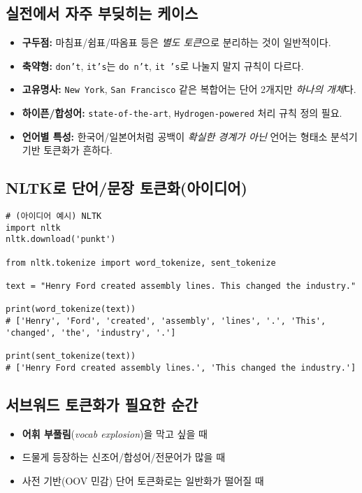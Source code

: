 \documentclass[12pt]{article}
\begin{document}
\subsection{실전에서 자주 부딪히는 케이스}
\begin{itemize}
  \item \textbf{구두점:} 마침표/쉼표/따옴표 등은 \emph{별도 토큰}으로 분리하는 것이 일반적이다.
  \item \textbf{축약형:} \texttt{don't}, \texttt{it's}는 \texttt{do n't}, \texttt{it 's}로 나눌지 말지 규칙이 다르다.
  \item \textbf{고유명사:} \texttt{New York}, \texttt{San Francisco} 같은 복합어는 단어 2개지만 \emph{하나의 개체}다.
  \item \textbf{하이픈/합성어:} \texttt{state-of-the-art}, \texttt{Hydrogen-powered} 처리 규칙 정의 필요.
  \item \textbf{언어별 특성:} 한국어/일본어처럼 공백이 \emph{확실한 경계가 아닌} 언어는 형태소 분석기 기반 토큰화가 흔하다.
\end{itemize}

\subsection{NLTK로 단어/문장 토큰화(아이디어)}
\begin{verbatim}
# (아이디어 예시) NLTK
import nltk
nltk.download('punkt')

from nltk.tokenize import word_tokenize, sent_tokenize

text = "Henry Ford created assembly lines. This changed the industry."

print(word_tokenize(text))
# ['Henry', 'Ford', 'created', 'assembly', 'lines', '.', 'This', 'changed', 'the', 'industry', '.']

print(sent_tokenize(text))
# ['Henry Ford created assembly lines.', 'This changed the industry.']
\end{verbatim}

\subsection{서브워드 토큰화가 필요한 순간}
\begin{itemize}
  \item \textbf{어휘 부풀림}(\emph{vocab explosion})을 막고 싶을 때
  \item 드물게 등장하는 신조어/합성어/전문어가 많을 때
  \item 사전 기반(OOV 민감) 단어 토큰화로는 일반화가 떨어질 때
\end{itemize}
\end{document}

